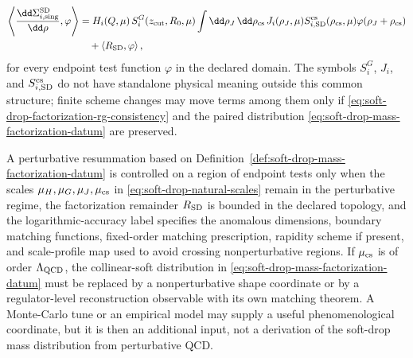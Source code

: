 \begin{definition}
\begin{equation}
\begin{aligned}
  \left\langle
  \frac{\dd\Sigma^{\rm SD}_{i,{\rm sing}}}{\dd\rho},
  \varphi
  \right\rangle
  &=
  H_i(Q,\mu)\,S^G_i(z_{\rm cut},R_0,\mu)
  \int \dd\rho_J\,\dd\rho_{\rm cs}\,
  J_i(\rho_J,\mu)
  S^{\rm cs}_{i,{\rm SD}}(\rho_{\rm cs},\mu)
  \varphi(\rho_J+\rho_{\rm cs})
\\
  &\quad+
  \left\langle R_{\rm SD},\varphi\right\rangle ,
  \label{eq:soft-drop-mass-factorization-datum}
\end{aligned}
\end{equation}
for every endpoint test function \(\varphi\) in the declared domain.  The
symbols \(S^G_i\), \(J_i\), and \(S^{\rm cs}_{i,{\rm SD}}\) do not have
standalone physical meaning outside this common structure; finite scheme changes
may move terms among them only if
\eqref{eq:soft-drop-factorization-rg-consistency} and the paired distribution
\eqref{eq:soft-drop-mass-factorization-datum} are preserved.
\end{definition}

\begin{controlledapproximation}
\label{ca:soft-drop-mass-factorized-resummation}
A perturbative resummation based on
Definition~\ref{def:soft-drop-mass-factorization-datum} is controlled on a
region of endpoint tests only when the scales
\(\mu_H,\mu_G,\mu_J,\mu_{\rm cs}\) in
\eqref{eq:soft-drop-natural-scales} remain in the perturbative regime, the
factorization remainder \(R_{\rm SD}\) is bounded in the declared topology, and
the logarithmic-accuracy label specifies the anomalous dimensions, boundary
matching functions, fixed-order matching prescription, rapidity scheme if
present, and scale-profile map used to avoid crossing nonperturbative
regions.  If \(\mu_{\rm cs}\) is of order \(\Lambda_{\rm QCD}\), the
collinear-soft distribution in
\eqref{eq:soft-drop-mass-factorization-datum} must be replaced by a
nonperturbative shape coordinate or by a regulator-level reconstruction
observable with its own matching theorem.  A Monte-Carlo tune or an empirical
model may supply a useful phenomenological coordinate, but it is then an
additional input, not a derivation of the soft-drop mass distribution from
perturbative QCD.
\end{controlledapproximation}

